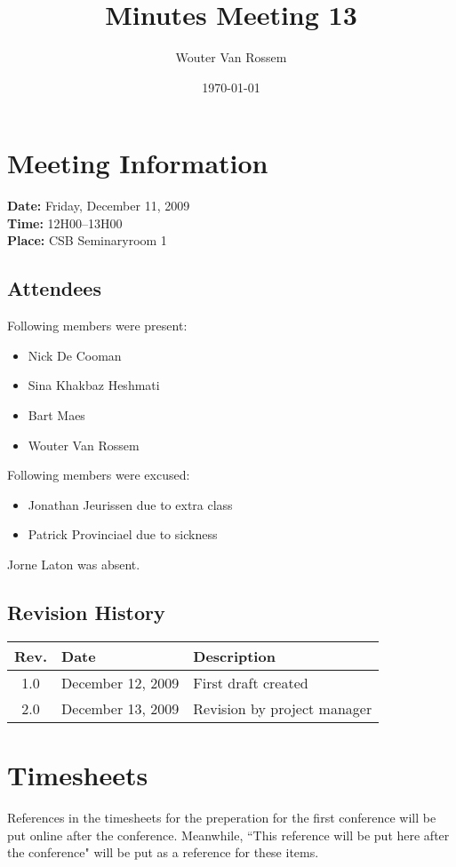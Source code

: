 \documentclass[a4paper, 12pt]{article}
\begin{document}
\title{Minutes Meeting 13}
\author{Wouter Van Rossem}
\date{\today}

\maketitle	
	\section{Meeting Information}
		\textbf{Date:} Friday, December 11, 2009\\
		\textbf{Time:} 12H00--13H00\\
		\textbf{Place:} CSB Seminaryroom 1\\
		\subsection{Attendees}
Following members were present:
			\begin{itemize}
				\item Nick De Cooman
				\item Sina Khakbaz Heshmati
				\item Bart Maes
				\item Wouter Van Rossem
			\end{itemize}
Following members were excused:
			\begin{itemize}
				\item Jonathan Jeurissen due to extra class
				\item Patrick Provinciael due to sickness
			\end{itemize}
Jorne Laton	was absent.		
			
		\subsection{Revision History}
			\begin{tabular}{c | l | l }
				\textbf{Rev.} & \textbf{Date} & \textbf{Description} \\
				\hline
				1.0 & December 12, 2009 & First draft created \\
				2.0 & December 13, 2009 & Revision by project manager \\
				

			\end{tabular}		

	\section{Timesheets}
References in the timesheets for the preperation for the first conference will be put online after the conference. Meanwhile, ``This reference will be put here after the conference" will be put as a reference for these items.
\end{document}
